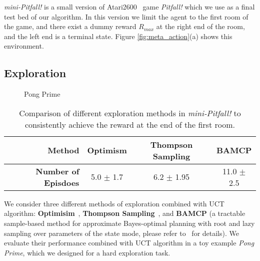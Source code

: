 \textit{mini-Pitfall!} is a small version of Atari2600~\citep{bellemare2013arcade} game \textit{Pitfall!} which we use as a final test bed of our algorithm. In this version we limit the agent to the first room of the game, and there exist a dummy reward $R_{max}$ at the right end of the room, and the left end is a terminal state. Figure \ref{fig:meta_action}(a) shows this environment. 

\subsection{Exploration}

\begin{figure}[tb]
    \centering
    \caption{Pong Prime}%
    \label{fig:pongp}%
\end{figure}

\begin{table}[tb]
  \begin{center}
    \begin{tabular}{r|c|c|c}
      \toprule 
      \textbf{Method} & Optimism & Thompson Sampling & BAMCP\\
      \midrule
      \textbf{Number of Episdoes} & 5.0 $\pm$ 1.7 & 6.2 $\pm$ 1.95 & 11.0 $\pm$ 2.5\\       
      \bottomrule %
      \end{tabular}
      
  \end{center}
  \caption{Comparison of different exploration methods in \textit{mini-Pitfall!} to consistently achieve the reward at the end of the first room.}
  \label{tab:mini_pitfall}
\end{table}

We consider three different methods of exploration combined with UCT algorithm: \textbf{Optimisim}~\citep{brafman2002r}, \textbf{Thompson Sampling}~\citep{thompson1933likelihood}, and \textbf{BAMCP} (a tractable sample-based method for approximate Bayes-optimal planning with root and lazy sampling over parameters of the state mode, please refer to~\cite{guez2012efficient} for details). We evaluate their performance combined with UCT algorithm in a toy example \textit{Pong Prime}, which we designed for a hard exploration task.



